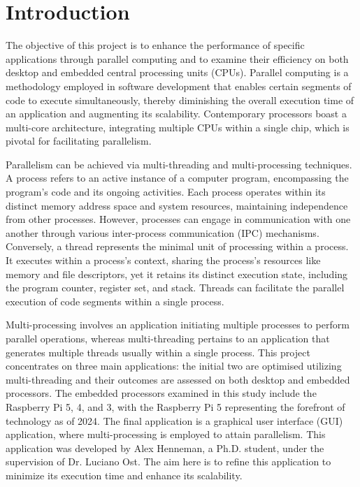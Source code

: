 \documentclass[12pt, openany]{book}
\begin{document}
\newpage
\tableofcontents

\chapter{Introduction}
The objective of this project is to enhance the performance of specific applications through parallel computing and to examine their efficiency on both desktop and embedded central processing units (CPUs). Parallel computing is a methodology employed in software development that enables certain segments of code to execute simultaneously, thereby diminishing the overall execution time of an application and augmenting its scalability. Contemporary processors boast a multi-core architecture, integrating multiple CPUs within a single chip, which is pivotal for facilitating parallelism\cite{modern_processors}.  

Parallelism can be achieved via multi-threading and multi-processing techniques. A process refers to an active instance of a computer program, encompassing the program's code and its ongoing activities. Each process operates within its distinct memory address space and system resources, maintaining independence from other processes. However, processes can engage in communication with one another through various inter-process communication (IPC) mechanisms. Conversely, a thread represents the minimal unit of processing within a process. It executes within a process's context, sharing the process’s resources like memory and file descriptors, yet it retains its distinct execution state, including the program counter, register set, and stack. Threads can facilitate the parallel execution of code segments within a single process\cite{multi_processing_multi_threading_article}.

Multi-processing involves an application initiating multiple processes to perform parallel operations, whereas multi-threading pertains to an application that generates multiple threads usually within a single process. This project concentrates on three main applications: the initial two are optimised utilizing multi-threading and their outcomes are assessed on both desktop and embedded processors. The embedded processors examined in this study include the Raspberry Pi 5, 4, and 3, with the Raspberry Pi 5 representing the forefront of technology as of 2024. The final application is a graphical user interface (GUI) application, where multi-processing is employed to attain parallelism. This application was developed by Alex Henneman, a Ph.D. student, under the supervision of Dr. Luciano Ost\cite{debate_fi_publication}. The aim here is to refine this application to minimize its execution time and enhance its scalability. 
\end{document}
